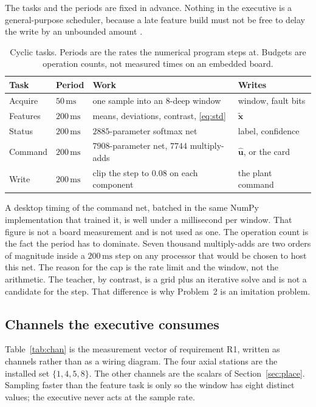 The tasks and the periods are fixed in advance. Nothing in the executive is a general-purpose scheduler, because a late feature build must not be free to delay the write by an unbounded amount \cite{astrom2008}.

\begin{table}[ht]
\centering
\caption{Cyclic tasks. Periods are the rates the numerical program steps at. Budgets are operation counts, not measured times on an embedded board.}
\label{tab:tasks}
\small
\begin{tabular}{@{}lllp{4.3cm}@{}}
\toprule
Task & Period & Work & Writes \\
\midrule
Acquire & \(50\,\mathrm{ms}\) & one sample into an 8-deep window & window, fault bits \\
Features & \(200\,\mathrm{ms}\) & means, deviations, contrast, \eqref{eq:std} & \(\tilde{\mathbf{x}}\) \\
Status & \(200\,\mathrm{ms}\) & \(2885\)-parameter softmax net & label, confidence \\
Command & \(200\,\mathrm{ms}\) & \(7908\)-parameter net, \(7744\) multiply-adds & \(\hat{\mathbf{u}}\), or the card \\
Write & \(200\,\mathrm{ms}\) & clip the step to \(0.08\) on each component & the plant command \\
\bottomrule
\end{tabular}
\end{table}

A desktop timing of the command net, batched in the same NumPy implementation that trained it, is well under a millisecond per window. That figure is not a board measurement and is not used as one. The operation count is the fact the period has to dominate. Seven thousand multiply-adds are two orders of magnitude inside a \(200\,\mathrm{ms}\) step on any processor that would be chosen to host this net. The reason for the cap is the rate limit and the window, not the arithmetic. The teacher, by contrast, is a grid plus an iterative solve and is not a candidate for the step. That difference is why Problem~2 is an imitation problem.

\subsection{Channels the executive consumes}

Table~\ref{tab:chan} is the measurement vector of requirement R1, written as channels rather than as a wiring diagram. The four axial stations are the installed set \(\{1,4,5,8\}\). The other channels are the scalars of Section~\ref{sec:place}. Sampling faster than the feature task is only so the window has eight distinct values; the executive never acts at the sample rate.

